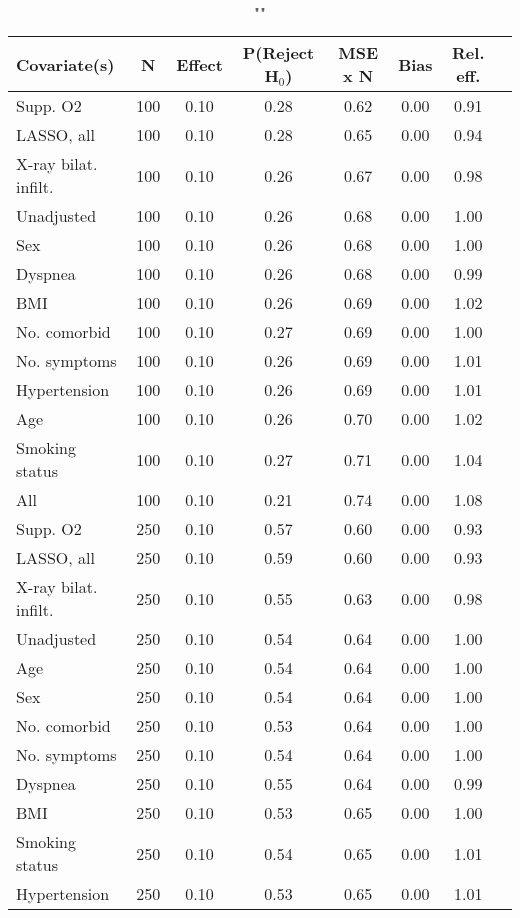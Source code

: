 \documentclass{article}
\begin{document}
{\tabcolsep=6pt  %
\begin{longtable}{lccccccc}
\caption{""} \\
Covariate(s) & N & Effect & P(Reject H$_0$) & MSE x N & Bias & Rel. eff.\\ \midrule
Supp. O2 & 100 & 0.10 & 0.28 & 0.62 & 0.00 & 0.91 \\ 
LASSO, all & 100 & 0.10 & 0.28 & 0.65 & 0.00 & 0.94 \\ 
X-ray bilat. infilt. & 100 & 0.10 & 0.26 & 0.67 & 0.00 & 0.98 \\ 
Unadjusted & 100 & 0.10 & 0.26 & 0.68 & 0.00 & 1.00 \\ 
Sex & 100 & 0.10 & 0.26 & 0.68 & 0.00 & 1.00 \\ 
Dyspnea & 100 & 0.10 & 0.26 & 0.68 & 0.00 & 0.99 \\ 
BMI & 100 & 0.10 & 0.26 & 0.69 & 0.00 & 1.02 \\ 
No. comorbid & 100 & 0.10 & 0.27 & 0.69 & 0.00 & 1.00 \\ 
No. symptoms & 100 & 0.10 & 0.26 & 0.69 & 0.00 & 1.01 \\ 
Hypertension & 100 & 0.10 & 0.26 & 0.69 & 0.00 & 1.01 \\ 
Age & 100 & 0.10 & 0.26 & 0.70 & 0.00 & 1.02 \\ 
Smoking status & 100 & 0.10 & 0.27 & 0.71 & 0.00 & 1.04 \\ 
All & 100 & 0.10 & 0.21 & 0.74 & 0.00 & 1.08 \\ \midrule 
Supp. O2 & 250 & 0.10 & 0.57 & 0.60 & 0.00 & 0.93 \\ 
LASSO, all & 250 & 0.10 & 0.59 & 0.60 & 0.00 & 0.93 \\ 
X-ray bilat. infilt. & 250 & 0.10 & 0.55 & 0.63 & 0.00 & 0.98 \\ 
Unadjusted & 250 & 0.10 & 0.54 & 0.64 & 0.00 & 1.00 \\ 
Age & 250 & 0.10 & 0.54 & 0.64 & 0.00 & 1.00 \\ 
Sex & 250 & 0.10 & 0.54 & 0.64 & 0.00 & 1.00 \\ 
No. comorbid & 250 & 0.10 & 0.53 & 0.64 & 0.00 & 1.00 \\ 
No. symptoms & 250 & 0.10 & 0.54 & 0.64 & 0.00 & 1.00 \\ 
Dyspnea & 250 & 0.10 & 0.55 & 0.64 & 0.00 & 0.99 \\ 
BMI & 250 & 0.10 & 0.53 & 0.65 & 0.00 & 1.00 \\ 
Smoking status & 250 & 0.10 & 0.54 & 0.65 & 0.00 & 1.01 \\ 
Hypertension & 250 & 0.10 & 0.53 & 0.65 & 0.00 & 1.01 \\ 

\end{longtable}}
\end{document}

